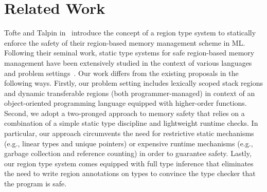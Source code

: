 \section{Related Work}
\label{sec:related-work}


Tofte and Talpin in~\cite{tofte93,tofte94,tofte97} introduce the
concept of a region type system to statically enforce the safety of
their region-based memory management scheme in ML. Following their
seminal work, static type systems for safe region-based memory
management have been extensively studied in the context of various
languages and problem settings~\cite{cyclone02, cyclone04, yates99,
MIT03, DPJ09, HMN01, WW01, rust, gpu14}. Our work differs from the
existing proposals in the following ways. Firstly, our problem setting
includes lexically scoped stack regions and dynamic transferable
regions (both programmer-managed) in context of an object-oriented
programming language equipped with higher-order functions. Second, we
adopt a two-pronged approach to memory safety that relies on a
combination of a simple static type discipline and lightweight runtime
checks. 
In particular, our approach circumvents the need for restrictive
static mechanisms (e.g., linear types and unique pointers) or
expensive runtime mechanisms (e.g., garbage collection and reference
counting) in order to guarantee safety. Lastly, our region type system
comes equipped with full type inference that eliminates the need to
write region annotations on types to convince the type checker that
the program is safe. 


